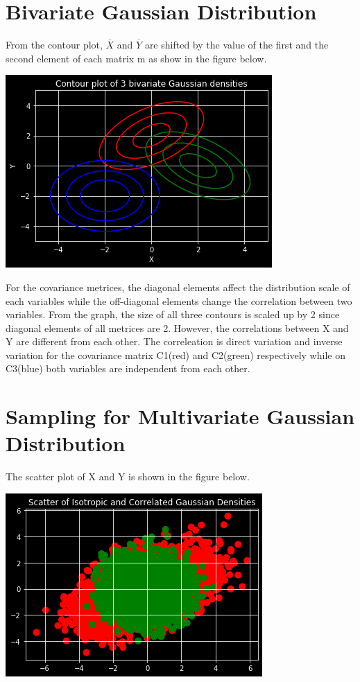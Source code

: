 \documentclass{article}
\begin{document}
\section{Bivariate Gaussian Distribution}
From the contour plot, $\overline{X}$ and $\overline{Y}$ are shifted by the value of the first and the second element of each matrix m as show in the figure below.
\begin{center}
\includegraphics[scale=0.4]{contours}
\end{center}

For the covariance metrices, the diagonal elements affect the distribution scale of each variables while the off-diagonal elements change the correlation between two variables. From the graph, the size of all three contours is scaled up by 2 since diagonal elements of all metrices are 2. However, the correlations between X and Y are different from each other. The correleation is direct variation and inverse variation for the covariance matrix C1(red) and C2(green) respectively while on C3(blue) both variables are independent from each other.

\maketitle
\section{Sampling for Multivariate Gaussian Distribution}
The scatter plot of X and Y is shown in the figure below.
\begin{center}
\includegraphics[scale=0.4]{scatter_of_isotropic}
\end{center}
\end{document}
